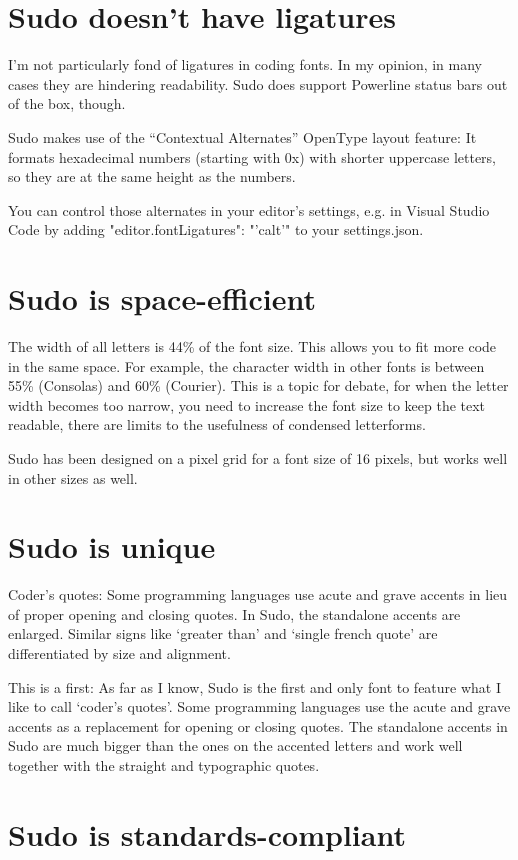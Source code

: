 \documentclass[paper=a4, 12pt]{scrbook}
\begin{document}
\section{Sudo doesn’t have ligatures}
I’m not particularly fond of ligatures in coding fonts. In my opinion, in many cases they are hindering readability. Sudo does support Powerline status bars out of the box, though.

Sudo makes use of the “Contextual Alternates” OpenType layout feature: It formats hexadecimal numbers (starting with 0x) with shorter uppercase letters, so they are at the same height as the numbers.

You can control those alternates in your editor’s settings, e.g. in Visual Studio Code by adding "editor.fontLigatures": "'calt'" to your settings.json.

\section{Sudo is space-efficient}

The width of all letters is 44\% of the font size. This allows you to fit more code in the same space. For example, the character width in other fonts is between 55\% (Consolas) and 60\% (Courier). This is a topic for debate, for when the letter width becomes too narrow, you need to increase the font size to keep the text readable, there are limits to the usefulness of condensed letterforms.

Sudo has been designed on a pixel grid for a font size of 16 pixels, but works well in other sizes as well.

\section{Sudo is unique}
Coder’s quotes: Some programming languages use acute and grave accents in lieu of proper opening and closing quotes. In Sudo, the standalone accents are enlarged. Similar signs like ‘greater than’ and ‘single french quote’ are differentiated by size and alignment.

This is a first: As far as I know, Sudo is the first and only font to feature what I like to call ‘coder’s quotes’. Some programming languages use the acute and grave accents as a replacement for opening or closing quotes. The standalone accents in Sudo are much bigger than the ones on the accented letters and work well together with the straight and typographic quotes.

\section{Sudo is standards-compliant}
\end{document}
